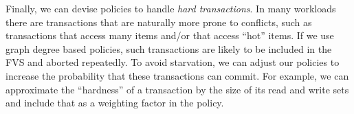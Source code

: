 Finally, we can devise policies to handle \emph{hard transactions}. In many workloads there are transactions that are naturally more prone to conflicts, such as transactions that access many items and/or that access ``hot'' items. If we use graph degree based policies, such transactions are likely to be included in the FVS and aborted repeatedly. To avoid starvation, we can adjust our policies to increase the probability that these transactions can commit. For example, we can approximate the ``hardness'' of a transaction by the size of its read and write sets and include that as a weighting factor in the policy. 





